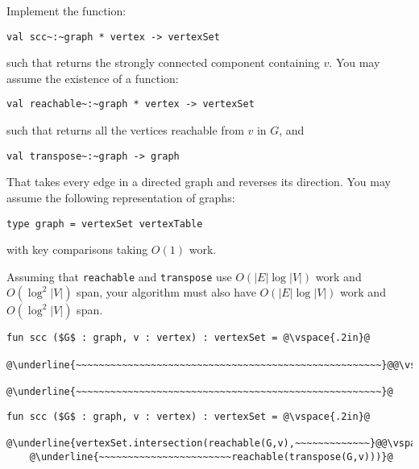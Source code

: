 \begin{problem}[10p]
\ask
Implement the function:
\begin{lstlisting}
val scc~:~graph * vertex -> vertexSet
\end{lstlisting}
such that  returns the strongly connected component containing $v$. You may assume
the existence of a function:
\begin{lstlisting}
val reachable~:~graph * vertex -> vertexSet
\end{lstlisting}
such that  returns all the vertices reachable from $v$
in $G$, and 
\begin{lstlisting}
val transpose~:~graph -> graph
\end{lstlisting}
That takes every edge in a directed graph and reverses its direction.
You may assume the following representation of graphs:
\begin{lstlisting}
type graph = vertexSet vertexTable
\end{lstlisting}
with key comparisons taking $O(1)$ work.

Assuming that \texttt{reachable} and \texttt{transpose} use
$O(|E|\log|V|)$ work and $O(\log^2 |V|)$ span, your algorithm
must also have $O(|E|\log|V|)$ work and $O(\log^2 |V|)$ span.

\begin{lstlisting}[numbers=none]
fun scc ($G$ : graph, v : vertex) : vertexSet = @\vspace{.2in}@
      @\underline{~~~~~~~~~~~~~~~~~~~~~~~~~~~~~~~~~~~~~~~~~~~~~~~~~~~~~}@@\vspace{.2in}@
      @\underline{~~~~~~~~~~~~~~~~~~~~~~~~~~~~~~~~~~~~~~~~~~~~~~~~~~~~~}@
\end{lstlisting}


\sol
\begin{lstlisting}[numbers=none]
fun scc ($G$ : graph, v : vertex) : vertexSet = @\vspace{.2in}@
    @\underline{vertexSet.intersection(reachable(G,v),~~~~~~~~~~~~~}@@\vspace{.2in}@
    @\underline{~~~~~~~~~~~~~~~~~~~~~~~reachable(transpose(G,v)))}@
\end{lstlisting}

\end{problem}

